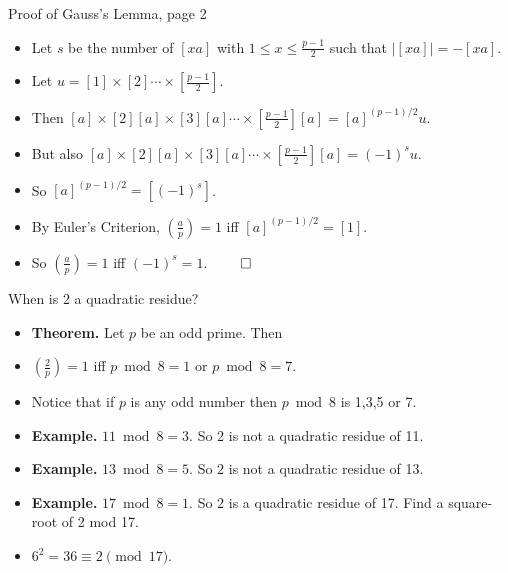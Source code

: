 \documentclass[handout]{beamer}
\begin{document}
\begin{frame}{Proof of Gauss's Lemma, page 2}

\begin{itemize}
  \item Let $s$ be the number of $[xa]$ with $1\leq x \leq \frac{p-1}{2}$ such that $|[xa]| = - [xa]$.
  \item Let $u=[1]\times[2]\cdots \times [\frac{p-1}{2}]$.
  \item Then $[a]\times[2][a]\times[3][a]\cdots \times [\frac{p-1}{2}][a] = [a]^{(p-1)/2} u$.
  \item But also $[a]\times[2][a]\times[3][a]\cdots \times [\frac{p-1}{2}][a] = (-1)^s u$.
  \item So $[a]^{(p-1)/2}=[(-1)^s]$.
  \item By Euler's Criterion, $(\frac{a}{p}) = 1$ iff $[a]^{(p-1)/2} = [1]$.
  \item So $(\frac{a}{p}) = 1$ iff $(-1)^s = 1$. $\qed$
\end{itemize}

\end{frame}

\begin{frame}{When is 2 a quadratic residue?}

\begin{itemize}
  \item \textbf{Theorem.}  Let $p$ be an odd prime. Then
  \item $(\frac{2}{p}) = 1$ iff $p\bmod 8 = 1$ or $p\bmod 8 = 7$.
  \item Notice that if $p$ is any odd number then $p \bmod 8$ is 1,3,5 or 7.
  \item \textbf{Example.} $11\bmod 8 = 3$. So $2$ is not a quadratic residue of 11.
  \item \textbf{Example.} $13\bmod 8 = 5$. So $2$ is not a quadratic residue of 13.
  \item \textbf{Example.} $17\bmod 8 = 1$. So $2$ is a quadratic residue of 17. Find a square-root of 2 mod 17.
  \item $6^2 = 36 \equiv 2 \pmod {17}$.
\end{itemize}

\end{frame}
\end{document}
